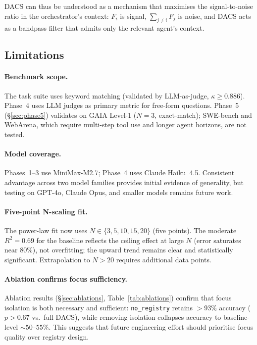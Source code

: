 \documentclass{article}
\begin{document}
DACS can thus be understood as a mechanism that maximises the
signal-to-noise ratio in the orchestrator's context:
$F_i$ is signal, $\sum_{j \neq i} F_j$ is noise, and DACS acts as
a bandpass filter that admits only the relevant agent's context.

\subsection{Limitations}

\paragraph{Benchmark scope.}
The task suite uses keyword matching (validated by LLM-as-judge,
$\kappa \geq 0.886$).
Phase~4 uses LLM judges as primary metric for free-form questions.
Phase~5 (\S\ref{sec:phase5}) validates on GAIA Level-1 ($N{=}3$,
exact-match); SWE-bench and WebArena, which require multi-step
tool use and longer agent horizons, are not tested.

\paragraph{Model coverage.}
Phases~1--3 use MiniMax-M2.7; Phase~4 uses Claude Haiku~4.5.
Consistent advantage across two model families provides initial evidence
of generality, but testing on GPT-4o, Claude Opus, and smaller models
remains future work.

\paragraph{Five-point N-scaling fit.}
The power-law fit now uses $N \in \{3, 5, 10, 15, 20\}$ (five points).
The moderate $R^2 = 0.69$ for the baseline reflects the ceiling effect
at large $N$ (error saturates near $80\%$), not overfitting;
the upward trend remains clear and statistically significant.
Extrapolation to $N > 20$ requires additional data points.

\paragraph{Ablation confirms focus sufficiency.}
Ablation results (\S\ref{sec:ablations}, Table~\ref{tab:ablations})
confirm that focus isolation is both necessary and sufficient:
\texttt{no\_registry} retains $>$93\% accuracy ($p > 0.67$ vs.\ full DACS),
while removing isolation collapses accuracy to baseline-level ${\sim}50$--$55\%$.
This suggests that future engineering effort should prioritise focus
quality over registry design.
\end{document}
